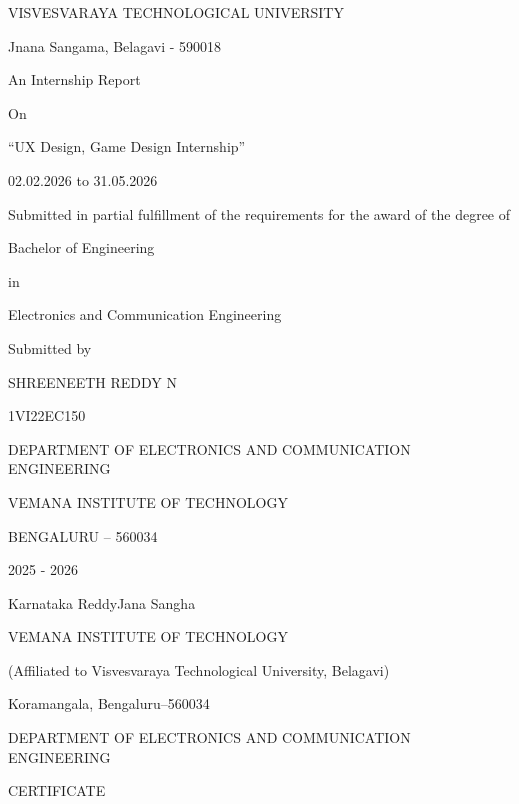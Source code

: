 \documentclass[12pt,a4paper]{report}
\begin{document}
\begin{titlepage}
\centering
{\Large VISVESVARAYA TECHNOLOGICAL UNIVERSITY\par}
\vspace{0.3cm}
{\large Jnana Sangama, Belagavi - 590018\par}
\vspace{1.2cm}
{\Large An Internship Report\par}
\vspace{0.4cm}
{\large On\par}
\vspace{0.4cm}
{\Large \textquotedblleft UX Design, Game Design Internship\textquotedblright\par}
\vspace{0.4cm}
{\large 02.02.2026 to 31.05.2026\par}
\vspace{1cm}
Submitted in partial fulfillment of the requirements for the award of the degree of\par
\vspace{0.3cm}
{\Large Bachelor of Engineering\par}
\vspace{0.2cm}
in\par
\vspace{0.2cm}
{\Large Electronics and Communication Engineering\par}
\vspace{1cm}
Submitted by\par
\vspace{0.3cm}
{\Large SHREENEETH REDDY N\par}
{\Large 1VI22EC150\par}
\vfill
{\Large DEPARTMENT OF ELECTRONICS AND COMMUNICATION ENGINEERING\par}
{\Large VEMANA INSTITUTE OF TECHNOLOGY\par}
{\Large BENGALURU -- 560034\par}
\vspace{0.4cm}
{\Large 2025 - 2026\par}
\end{titlepage}

\setcounter{page}{1}
\begin{center}
{\Large Karnataka ReddyJana Sangha\par}
{\Large VEMANA INSTITUTE OF TECHNOLOGY\par}
(Affiliated to Visvesvaraya Technological University, Belagavi)\par
Koramangala, Bengaluru--560034\par
\vspace{0.5cm}
{\Large DEPARTMENT OF ELECTRONICS AND COMMUNICATION ENGINEERING\par}
\vspace{1cm}
{\Large CERTIFICATE\par}
\end{center}
\end{document}
